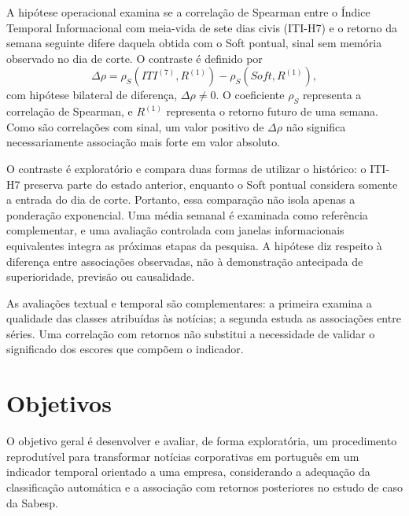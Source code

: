A hipótese operacional examina se a correlação de Spearman entre o Índice Temporal Informacional com meia-vida de sete dias civis (ITI-H7) e o retorno da semana seguinte difere daquela obtida com o Soft pontual, sinal sem memória observado no dia de corte. O contraste é definido por
\begin{equation*}
\Delta\rho=\rho_S(ITI^{(7)},R^{(1)})-\rho_S(Soft,R^{(1)}),
\end{equation*}
com hipótese bilateral de diferença, $\Delta\rho\neq0$. O coeficiente $\rho_S$ representa a correlação de Spearman, e $R^{(1)}$ representa o retorno futuro de uma semana. Como são correlações com sinal, um valor positivo de $\Delta\rho$ não significa necessariamente associação mais forte em valor absoluto.

O contraste é exploratório e compara duas formas de utilizar o histórico: o ITI-H7 preserva parte do estado anterior, enquanto o Soft pontual considera somente a entrada do dia de corte. Portanto, essa comparação não isola apenas a ponderação exponencial. Uma média semanal é examinada como referência complementar, e uma avaliação controlada com janelas informacionais equivalentes integra as próximas etapas da pesquisa. A hipótese diz respeito à diferença entre associações observadas, não à demonstração antecipada de superioridade, previsão ou causalidade.

As avaliações textual e temporal são complementares: a primeira examina a qualidade das classes atribuídas às notícias; a segunda estuda as associações entre séries. Uma correlação com retornos não substitui a necessidade de validar o significado dos escores que compõem o indicador.

\section{Objetivos}

O objetivo geral é desenvolver e avaliar, de forma exploratória, um procedimento reprodutível para transformar notícias corporativas em português em um indicador temporal orientado a uma empresa, considerando a adequação da classificação automática e a associação com retornos posteriores no estudo de caso da Sabesp.

